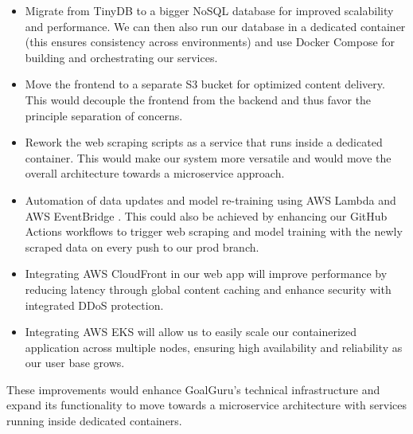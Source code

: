 \documentclass[conference,a4paper,flushend]{cs-techrep}
\begin{document}
\begin{itemize}
\item Migrate from TinyDB to a bigger NoSQL database for improved scalability and performance. We can then also run our database in a dedicated container (this ensures consistency across environments) and use Docker Compose \cite{docker-compose} for building and orchestrating our services.
\item Move the frontend to a separate S3 bucket for optimized content delivery. This would decouple the frontend from the backend and thus favor the principle separation of concerns.
\item Rework the web scraping scripts as a service that runs inside a dedicated container. This would make our system more versatile and would move the overall architecture towards a microservice approach.
\item Automation of data updates and model re-training using AWS Lambda \cite{noauthor_aws_nodate} and AWS EventBridge \cite{noauthor_serverless_nodate}. This could also be achieved by enhancing our GitHub Actions workflows to trigger web scraping and model training with the newly scraped data on every push to our prod branch.
\item Integrating AWS CloudFront \cite{noauthor_what_nodate-1} in our web app will improve performance by reducing latency through global content caching and enhance security with integrated DDoS protection.
\item Integrating AWS EKS \cite{noauthor_what_nodate} will allow us to easily scale our containerized application across multiple nodes, ensuring high availability and reliability as our user base grows. 

\end{itemize}
These improvements would enhance GoalGuru's technical infrastructure and expand its functionality to move towards a microservice architecture with services running inside dedicated containers.
\end{document}
